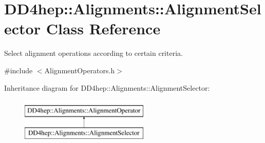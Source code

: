 \hypertarget{class_d_d4hep_1_1_alignments_1_1_alignment_selector}{}\section{D\+D4hep\+:\+:Alignments\+:\+:Alignment\+Selector Class Reference}
\label{class_d_d4hep_1_1_alignments_1_1_alignment_selector}


Select alignment operations according to certain criteria.  




{\ttfamily \#include $<$Alignment\+Operators.\+h$>$}

Inheritance diagram for D\+D4hep\+:\+:Alignments\+:\+:Alignment\+Selector\+:\begin{figure}[H]
\begin{center}
\leavevmode
\includegraphics[height=2.000000cm]{class_d_d4hep_1_1_alignments_1_1_alignment_selector}
\end{center}
\end{figure}
